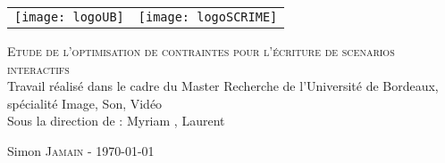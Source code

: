 \begin{titlepage}
    
    \begin{center}
    	\begin{tabular}{cc}
    		\texttt{[image: logoUB]} & \texttt{[image: logoSCRIME]}
    	\end{tabular}


        \begin{spacing}{1.7}
        \textsc{\Huge Etude de l'optimisation de contraintes pour l'écriture de scenarios interactifs}\\[1cm]
        {\huge Travail réalisé dans le cadre du Master Recherche de l'Université de Bordeaux, spécialité Image, Son, Vidéo}\\[1cm]
        {\Large Sous la direction de : }
        {\Large Myriam ,
         Laurent }
        \end{spacing}
    \end{center}

    \begin{flushbottom}
        \begin{flushleft}
            \large Simon \textsc{Jamain} - \today \\
        \end{flushleft}
    \end{flushbottom}
    
\end{titlepage}
\clearpage
\restoregeometry